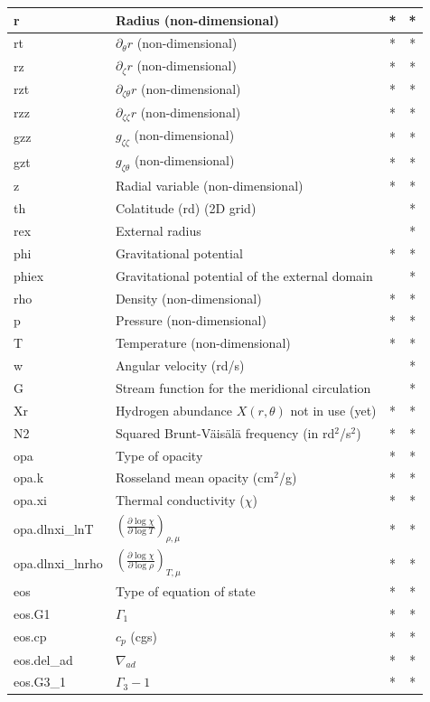 \begin{longtable}{|l|p{8cm}|c|c|}
\hline
r&Radius (non-dimensional) &*&*\\
\hline
rt& $\partial_\theta r$ (non-dimensional) &*&*\\
\hline
rz& $\partial_\zeta r$ (non-dimensional) &*&*\\
\hline
rzt& $\partial_{\zeta\theta} r$ (non-dimensional) &*&*\\
\hline
rzz& $\partial_{\zeta\zeta} r$ (non-dimensional) &*&*\\
\hline
gzz& $g_{\zeta\zeta}$ (non-dimensional) &*&*\\
\hline
gzt& $g_{\zeta\theta}$ (non-dimensional) &*&*\\
\hline
z&Radial variable (non-dimensional)&*&*\\
\hline
th&Colatitude (rd) (2D grid) &&*\\
\hline
rex&External radius&&*\\
\hline
phi&Gravitational potential&*&*\\
\hline
phiex&Gravitational potential of the external domain&&*\\
\hline
rho&Density (non-dimensional)&*&*\\
\hline
p&Pressure (non-dimensional)&*&*\\
\hline
T&Temperature (non-dimensional)&*&*\\
\hline
w&Angular velocity (rd/s)&&*\\
\hline
G&Stream function for the meridional circulation&&*\\
\hline
Xr&Hydrogen abundance $X(r,\theta)$ not in use (yet) &*&*\\
\hline
N2&Squared Brunt-V\"ais\"al\"a frequency (in rd$^2$/s$^2$)&*&*\\
\hline
opa&Type of opacity&*&*\\
\hline
opa.k&Rosseland mean opacity (cm$^2$/g) &*&*\\
\hline
opa.xi&Thermal conductivity ($\chi$)&*&*\\
\hline
opa.dlnxi\_lnT&$\left(\frac{\partial\log\chi}{\partial\log T}\right)_{\rho,\mu}$&*&*\\
\hline
opa.dlnxi\_lnrho&$\left(\frac{\partial\log\chi}{\partial\log\rho}\right)_{T,\mu}$&*&*\\
\hline
eos&Type of equation of state&*&*\\
\hline
eos.G1&$\Gamma_1$&*&*\\
\hline
eos.cp&$c_p$ (cgs) &*&*\\
\hline
eos.del\_ad&$\nabla_{ad}$&*&*\\
\hline
eos.G3\_1&$\Gamma_3-1$&*&*\\

\end{longtable}
